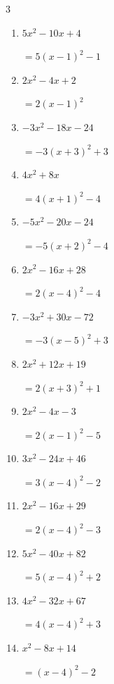 \begin{multicols}{3}
\begin{enumerate}
  \item $5x^{2}-10x+4$

        $=5\left( x-1\right)^{2}-1$

\columnbreak %

  \item $2x^{2}-4x+2$

        $=2\left( x-1\right)^{2}$

  \item $-3x^{2}-18x-24$

        $=-3\left( x+3\right)^{2}+3$

  \item $4x^{2}+8x$

        $=4\left( x+1\right)^{2}-4$

  \item $-5x^{2}-20x-24$

        $=-5\left( x+2\right)^{2}-4$

  \item $2x^{2}-16x+28$

        $=2\left( x-4\right)^{2}-4$

  \item $-3x^{2}+30x-72$

        $=-3\left( x-5\right)^{2}+3$

  \item $2x^{2}+12x+19$

        $=2\left( x+3\right)^{2}+1$

  \item $2x^{2}-4x-3$

        $=2\left( x-1\right)^{2}-5$

  \item $3x^{2}-24x+46$

        $=3\left( x-4\right)^{2}-2$

  \item $2x^{2}-16x+29$

        $=2\left( x-4\right)^{2}-3$

\columnbreak %

  \item $5x^{2}-40x+82$

        $=5\left( x-4\right)^{2}+2$

  \item $4x^{2}-32x+67$

        $=4\left( x-4\right)^{2}+3$

  \item $x^{2}-8x+14$

        $=\left( x-4\right)^{2}-2$


\end{enumerate}
\end{multicols}
